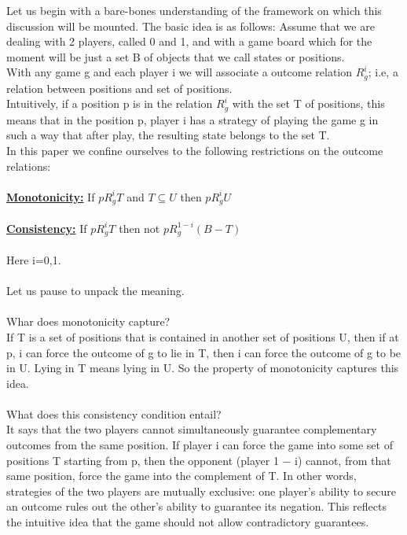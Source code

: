 \documentclass[12pt]{article}
\begin{document}
Let us begin with a bare-bones understanding of the framework on which this 
discussion will be mounted. The basic idea is as follows: Assume that we are dealing with 2 players, called 0 and 1, and with a game board which for the moment will be just a set B of objects that we call states or positions. \\
With any game g and each player i we will associate a outcome relation $R_{g}^{i}$; i.e, a relation between positions and set of positions. \\
Intuitively, if a position p is in the relation $R_{g}^{i}$ with the set T of positions, this means that in the position p, player i has a strategy of playing the game g in such a way that after play, the resulting state belongs to the set T. \\ 
In this paper we confine ourselves to the following restrictions on the outcome relations: \\ \\
\underline{\textbf{Monotonicity:}} If $pR_{g}^{i}T$ and $T\subseteq U$ then $pR_{g}^{i}U$ \\ \\
\underline{\textbf{Consistency:}} If $pR_{g}^{i}T$ then not $pR_{g}^{1-i}(B-T)$ \\ \\
Here i=0,1. \\ \\
Let us pause to unpack the meaning. \\ \\
Whar does monotonicity capture? \\
If T is a set of positions that is contained in another set of positions U, then if at p, i can force the outcome of g to lie in T, then i can force the outcome of g to be in U. Lying in T means lying in U. So the property of monotonicity captures this idea. \\ \\
What does this consistency condition entail? \\ 
It says that the two players cannot simultaneously guarantee complementary outcomes from the same position. If player i can force the game into some set of positions T starting from p, then the opponent (player 1 − i) cannot, from that same position, force the game into the complement of T. In other words, strategies of the two players are mutually exclusive: one player’s ability to secure an outcome rules out the other’s ability to guarantee its negation. This reflects the intuitive idea that the game should not allow contradictory guarantees. \\ \\
\end{document}
